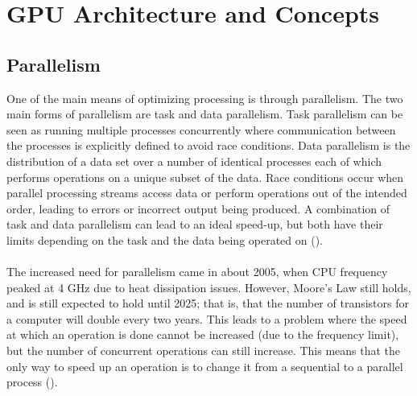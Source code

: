 \section{GPU Architecture and Concepts}\label{gpu}
\subsection{Parallelism}\label{gpu:sec:par}
One of the main means of optimizing processing is through parallelism. The two main forms of parallelism are task and data parallelism. Task parallelism can be seen as running multiple processes concurrently where communication between the processes is explicitly defined to avoid race conditions. Data parallelism is the distribution of a data set over a number of identical processes each of which performs operations on a unique subset of the data. Race conditions occur when parallel processing streams access data or perform operations out of the intended order, leading to errors or incorrect output being produced. A combination of task and data parallelism can lead to an ideal speed-up, but both have their limits depending on the task and the data being operated on (\cite{subhlok1993exploiting}).
\\
\\
The increased need for parallelism came in about 2005, when CPU frequency peaked at 4 GHz due to heat dissipation issues. However, Moore's Law still holds, and is still expected to hold until 2025; that is, that the number of transistors for a computer will double every two years. This leads to a problem where the speed at which an operation is done cannot be increased (due to the frequency limit), but the number of concurrent operations can still increase. This means that the only way to speed up an operation is to change it from a sequential to a parallel process (\cite{rajan2013informatics}).
